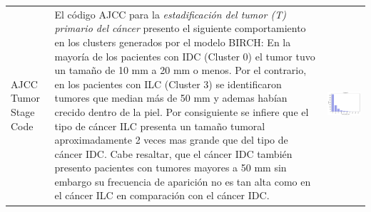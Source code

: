 \begin{table}[htb!]
	\footnotesize
	\begin{threeparttable}
		\begin{tabular}{p{2.5cm} p{7cm} p{6.5cm}} \toprule
			AJCC Tumor Stage Code 
			& 
			El código AJCC para la \textit{estadificación del tumor (T) primario del cáncer} presento el siguiente comportamiento en los clusters generados por el modelo BIRCH: En la mayoría de los pacientes con IDC (Cluster 0) el tumor tuvo un tamaño de 10 mm a 20 mm o menos. Por el contrario, en los pacientes con ILC (Cluster 3) se identificaron tumores que median más de 50 mm y ademas habían crecido dentro de la piel. Por consiguiente se infiere que el tipo de cáncer ILC presenta un tamaño tumoral aproximadamente 2 veces mas grande que del tipo de cáncer IDC. Cabe resaltar, que el cáncer IDC también presento pacientes con tumores mayores a 50 mm sin embargo su frecuencia de aparición no es tan alta como en el cáncer ILC en comparación con el cáncer IDC.
			& 
			\begin{center}\includegraphics[width=1\linewidth]{NOTEBOOK/IMAGENES_BIRCH_CLUSTERING/4_Cluster_0_tumor_stage_code}\end{center}

\end{tabular}
\end{threeparttable}
\end{table}
